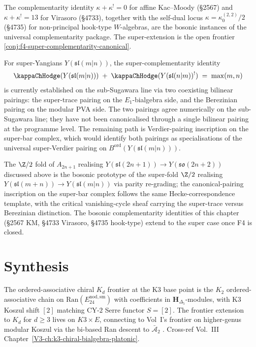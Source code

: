 The complementarity identity $\kappa + \kappa^{!} = 0$ for affine
Kac--Moody (\S2567) and $\kappa + \kappa^{!} = 13$ for Virasoro
(\S4733), together with the self-dual locus
$\kappa = \kappa_{0}^{(2,2)}/2$ (\S4735) for non-principal
hook-type $W$-algebras, are the bosonic instances of the universal
complementarity package. The super-extension is the open frontier
\cref{conj:f4-super-complementarity-canonical}.

\begin{remark}[F4 anchor: $\kappa + \kappa^{!} = \max(m, n)$ on
super-Yangians]
\label{rem:ordered-kd-frontier-anchor-f4}
For super-Yangians $Y(\mathfrak{sl}(m | n))$, the
super-complementarity identity
\[
 \kappaChHodge(Y(\mathfrak{sl}(m | n)))
 \;+\;
 \kappaChHodge(Y(\mathfrak{sl}(n | m))^{!})
 \;=\;
 \max(m, n)
\]
is currently established on the sub-Sugawara line via two
coexisting bilinear pairings: the super-trace pairing on the
$E_{1}$-bialgebra side, and the Berezinian pairing on the modular
PVA side. The two pairings agree numerically on the sub-Sugawara
line; they have not been canonicalised through a single bilinear
pairing at the programme level. The remaining path is
Verdier-pairing inscription on the super-bar complex, which
would identify both pairings as specialisations of the universal
super-Verdier pairing on $B^{\mathrm{ord}}(Y(\mathfrak{sl}(m | n)))$.

The $\Z/2$ fold of $A_{2n + 1}$ realising
$Y(\mathfrak{sl}(2n + 1)) \to Y(\mathfrak{so}(2n + 2))$
discussed above is the bosonic prototype of the super-fold
$\Z/2$ realising
$Y(\mathfrak{sl}(m + n)) \to Y(\mathfrak{sl}(m | n))$ via parity
re-grading; the canonical-pairing inscription on the super-bar
complex follows the same Hecke-correspondence template, with the
critical vanishing-cycle sheaf carrying the super-trace versus
Berezinian distinction. The bosonic complementarity identities
of this chapter (\S2567 KM, \S4733 Virasoro, \S4735 hook-type)
extend to the super case once F4 is closed.
\end{remark}

\section{Synthesis}
\label{sec:oackdf-supplement}

\begin{remark}
\label{rem:oackdf-1}
The ordered-associative chiral $K_d$ frontier at the K3 base
point is the $K_2$ ordered-associative chain on
$\mathrm{Ran}(E^{\mathrm{nod,sm}}_{24})$ with coefficients in
$\mathbf H_{\Delta_5}$-modules, with K3 Koszul shift $[2]$ matching
CY-$2$ Serre functor $S = [2]$. The frontier extension to $K_d$ for
$d\geq 3$ lives on $K3\times E$, connecting to Vol~I's frontier on
higher-genus modular Koszul via the bi-based Ran descent to
$\bar{\mathcal A}_2$ \cite{FrancisGaitsgoryFactorization,KugaSatake1967}.
Cross-ref Vol.~III Chapter~\ref{V3-ch:k3-chiral-bialgebra-platonic}.
\end{remark}

